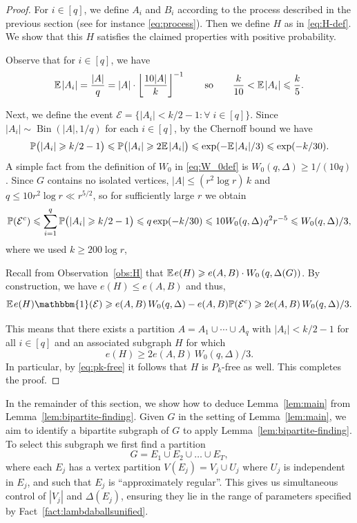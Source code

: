 \documentclass[12pt,reqno]{amsart}
\theoremstyle{remark}
\numberwithin{theorem}{section}
\renewcommand{\(}{\bigl(}
\renewcommand{\)}{\bigr)\vphantom{)}}
\renewcommand{\leq}{\le}
\renewcommand{\geq}{\ge}
\newcommand{\cE}{\mathcal E}
\def\1{\mathbbm{1}}
\renewcommand{\le}{\leqslant}
\renewcommand{\ge}{\geqslant}
\newcommand{\EE}{\mathbb E}
\newcommand{\PP}{\mathbb P}
\newcommand{\Bin}{\operatorname{Bin}}
\begin{document}
\begin{proof}
For $i \in [q]$, we define $A_i$ and $B_i$ according to the process described in the previous section (see for instance \eqref{eq:process}). Then we define $H$ as in \eqref{eq:H-def}. We show that this $H$ satisfies the claimed properties with positive probability. 

Observe that for $i\in [q]$, we have
\[ \mathbb{E}\hspace{0.1em}|A_i|=\frac{|A|}{q}=|A| \cdot \left \lfloor \frac{10|A|}{k}\right\rfloor^{-1} \qquad \text{so} \qquad \frac{k}{10} <\mathbb{E} \hspace{0.1em}|A_i|\leq \frac{k}{5}.\]

Next, we define the event  $\cE = \{ |A_i| < k/2 - 1 : \forall \; i \in [q] \}$. Since $|A_i| \sim \Bin(|A|,1/q)$ for each $i\in [q]$, by the Chernoff bound we have
\[ \PP\big(|A_i| \geq k/2 - 1 \big)\leq \PP\big(|A_i| \geq 2\mathbb{E} \hspace{0.1em}|A_i|\big) \leq 
\exp (-\mathbb{E} \hspace{0.1em} |A_i|/3)\leq \exp(-k/30).\]
A simple fact from the definition of $W_0$ in \eqref{eq:W_0def} is $W_0(q,\Delta)\geq 1/(10q)$. Since $G$ contains no isolated vertices, $|A|\leq (r^2 \log r)\,k$ and $q\leq 10r^2 \log r\ll r^{5/2}$, so for sufficiently large $r$ we obtain
\[ \PP(\cE^c) \leq\sum_{i=1}^q\PP\big(|A_i|\geq k/2-1 \big)\leq  q \exp(-k/30 )\leq 10W_0(q,\Delta) \hspace{0.1em} q^2r^{-5}\leq W_0(q,\Delta)/3,\]
where we used $k\geq 200\log r$, 

Recall from Observation~\ref{obs:H} that  $\EE \hspace{0.1em} e(H)\geq e(A,B) \cdot W_0\left( q, \Delta(G)\right)$. By construction, we have $e(H)\leq e(A,B)$ and thus,
\[ \EE \hspace{0.1em}  e(H) \1(\cE)\geq e(A,B) \, W_0(q,\Delta) - e(A,B) \PP(\cE^c)\geq 2e(A,B) \, W_0(q,\Delta)/3. \]

This means that there exists a partition $A = A_1 \cup \cdots \cup A_q$ with $|A_i| < k/2 - 1$ for all $i \in [q]$ and an associated subgraph $H$ for which 
\[ e(H) \geq 2e(A,B) \, W_0(q,\Delta)/3 . \] 
In particular, by \eqref{eq:pk-free} it follows that $H$ is $P_k$-free as well. This completes the proof. 
\end{proof}

In the remainder of this section, we show how to deduce Lemma~\ref{lem:main} from Lemma~\ref{lem:bipartite-finding}. Given $G$ in the setting of Lemma~\ref{lem:main}, we aim to identify a bipartite subgraph of $G$ to apply Lemma~\ref{lem:bipartite-finding}. To select this subgraph we first find a partition 
\begin{equation}\label{eq:part-G}
    G = E_1\cup E_2\cup\dots \cup E_T,
\end{equation}
where each $E_j$ has a vertex partition $V(E_j)=V_j\cup U_j$ where $U_j$ is independent in $E_j$, and such that $E_j$  is ``approximately regular''. This gives us simultaneous control of $|V_j|$ and $\Delta(E_j)$, ensuring they lie in the range of parameters specified by Fact~\ref{fact:lambdaballsunified}.
\end{document}
